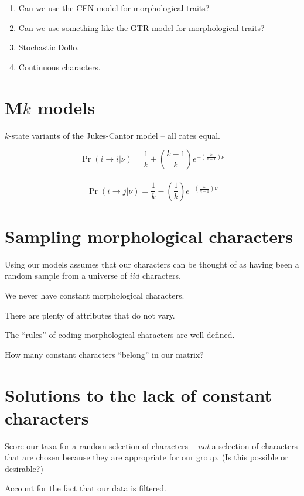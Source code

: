 \documentclass[landscape]{foils}
\begin{document}
\pagecolor{white}
\unitlength=1mm
\myNewSlide
\Large
\begin{enumerate}
	\item Can we use the CFN model for morphological traits?
	\item Can we use something like the GTR model for morphological traits?
	\item Stochastic Dollo.
	\item Continuous characters.
\end{enumerate}

\myNewSlide
\section*{M$k$ models}
$k$-state variants of the Jukes-Cantor model -- all rates equal.

$$\Pr(i\rightarrow i|\nu) = \frac{1}{k} + \left(\frac{k-1}{k}\right)e^{-\left(\frac{k}{k-1}\right)\nu}$$\\
$$\Pr(i\rightarrow j|\nu) = \frac{1}{k} - \left(\frac{1}{k}\right)e^{-\left(\frac{k}{k-1}\right)\nu} $$

\myNewSlide
\section*{Sampling morphological characters}
Using our models assumes that our characters can be thought of as having been a random sample from a universe of $iid$ characters.

\begin{compactenum}
	\item We never have constant morphological characters.
	\begin{compactenum}
		\item There are plenty of attributes that do not vary.
		\item The ``rules'' of coding morphological characters are well-defined.
		\item How many constant characters ``belong'' in our matrix?
	\end{compactenum}
\end{compactenum}

\myNewSlide
\section*{Solutions to the lack of constant characters}

\begin{compactenum}
	\item Score our taxa for a random selection of characters -- {\em not} a selection of characters that are chosen because they are appropriate for our group.  (Is this possible or desirable?)
	\item Account for the fact that our data is filtered.
\end{compactenum}
\end{document}
